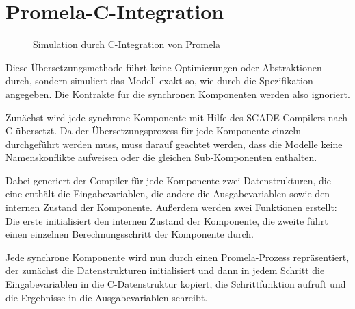 \section{Promela-C-Integration}
\begin{figure}
  \centering
  \caption{Simulation durch C-Integration von Promela}
\end{figure}

Diese Übersetzungsmethode führt keine Optimierungen oder Abstraktionen durch, sondern simuliert das Modell exakt so, wie durch die Spezifikation angegeben.
Die Kontrakte für die synchronen Komponenten werden also ignoriert.

Zunächst wird jede synchrone Komponente mit Hilfe des SCADE-Compilers nach C übersetzt.
Da der Übersetzungsprozess für jede Komponente einzeln durchgeführt werden muss, muss darauf geachtet werden, dass die Modelle keine Namenskonflikte aufweisen oder die gleichen Sub-Komponenten enthalten\cite{scade_c_integration}.

Dabei generiert der Compiler für jede Komponente zwei Datenstrukturen, die eine enthält die Eingabevariablen, die andere die Ausgabevariablen sowie den internen Zustand der Komponente.
Außerdem werden zwei Funktionen erstellt:
Die erste initialisiert den internen Zustand der Komponente, die zweite führt einen einzelnen Berechnungsschritt der Komponente durch.

Jede synchrone Komponente wird nun durch einen Promela-Prozess repräsentiert, der zunächst die Datenstrukturen initialisiert und dann in jedem Schritt die Eingabevariablen in die C-Datenstruktur kopiert, die Schrittfunktion aufruft und die Ergebnisse in die Ausgabevariablen schreibt.
